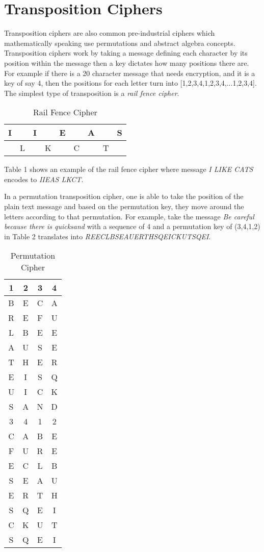 \documentclass[12pt,letterpaper]{article} %
\begin{document}
\section{Transposition Ciphers}
Transposition ciphers are also common pre-industrial ciphers which mathematically speaking use permutations and abstract algebra concepts. Transposition ciphers work by taking a message 
defining each character by its position within the message then a key dictates how many positions there are.  For example if there is a 20 character message that needs
encryption, and it is a key of say 4, then the positions for each letter turn into [1,2,3,4,1,2,3,4,...1,2,3,4].  The simplest type of transposition is a \emph{rail fence cipher}.
\begin{table}[h]
\begin{center}
\begin{tabular}{ | c | c | c | c | c | c | c | c | c |}
\hline
I &  & I &  & E &  & A &  & S \\
\hline
 & L &  & K &  & C &  & T &   \\
\hline
\end{tabular}
\caption{Rail Fence Cipher}
\label{tab:template}
\end{center}
\end{table}
Table 1 shows an example of the rail fence cipher where message \emph{I LIKE CATS} encodes to \emph{IIEAS LKCT}. 
\par
In a permutation transposition cipher, one is able to take the position of the plain text message and based on the permutation key, they move around the letters according to 
that permutation.  For example, take the message \emph{Be careful because there is quicksand} with a  sequence of 4 and a permutation key of (3,4,1,2) in Table 2 translates into \emph{REECLBSEAUERTHSQEICKUTSQEI}. \newpage
\begin{table}[h]
\begin{center}
\begin{tabular}{ | c | c | c | c| }
\hline
1 & 2 & 3 & 4 \\
\hline
B & E & C & A \\
R& E & F&U\\
L&B&E&E\\
A&U&S&E\\
T&H&E&R\\
E&I&S&Q\\
U&I&C&K\\
S&A&N&D\\
\hline
\hline
3& 4& 1 &2\\
\hline
C&A&B&E\\
F&U&R&E\\
E&C&L&B\\
S&E&A&U\\
E&R&T&H\\
S&Q&E&I\\
C&K&U&T\\
S&Q&E&I\\
\hline
\end{tabular}
\caption{Permutation Cipher}
\label{tab:template}
\end{center}
\end{table}
\end{document}
